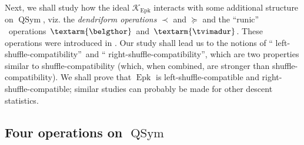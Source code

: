 \documentclass[numbers=enddot,12pt,final,onecolumn,notitlepage]{scrartcl}%
\theoremstyle{definition}
\newcommand{\tvi}{\left. \textarm{\tvimadur} \right.}
\newcommand{\bel}{\left. \textarm{\belgthor} \right.}
\begin{document}
Next, we shall study how the ideal $\mathcal{K}_{\operatorname*{Epk}}$
interacts with some additional structure on $\operatorname*{QSym}$, viz. the
\textit{dendriform operations }$\left.  \prec\right.  $ and $\left.
\succeq\right.  $ and the \textquotedblleft runic\textquotedblright%
\ operations $\bel$ and $\tvi$. These operations were introduced in
\cite{dimcr}. Our study shall lead us to the notions of \textquotedblleft
left-shuffle-compatibility\textquotedblright\ and \textquotedblleft
right-shuffle-compatibility\textquotedblright, which are two properties
similar to shuffle-compatibility (which, when combined, are stronger than
shuffle-compatibility). We shall prove that $\operatorname*{Epk}$ is
left-shuffle-compatible and right-shuffle-compatible; similar studies can
probably be made for other descent statistics.

\subsection{Four operations on $\operatorname*{QSym}$}
\end{document}
